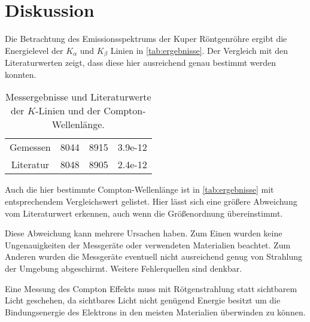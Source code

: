 \section{Diskussion}
\label{sec:Diskussion}


Die Betrachtung des Emissionsspektrums der Kuper Röntgenröhre ergibt die Energielevel der $K_\alpha$ und $K_\beta$ Linien in \autoref{tab:ergebnisse}. Der Vergleich mit den Literaturwerten zeigt, dass diese hier ausreichend genau bestimmt werden konnten.

\begin{table}
    \centering
    \caption{Messergebnisse und Literaturwerte der $K$-Linien und der Compton-Wellenlänge.}
    \begin{tabular}{c S[table-format=4.0] S[table-format=4.0] S[table-format=1.3e-2]}
        \toprule
        &  &  & \\
        \midrule
        Gemessen & 8044 & 8915 & 3.9e-12 \\
        Literatur\cite{xray}\cite{physics_constants} & 8048 & 8905 & 2.4e-12 \\
        \bottomrule
    \end{tabular}
    \label{tab:ergebnisse}
\end{table}

Auch die hier bestimmte Compton-Wellenlänge ist in \autoref{tab:ergebnisse} mit entsprechendem Vergleichswert gelistet.
Hier lässt sich eine größere Abweichung vom Literaturwert erkennen, auch wenn die Größenordnung übereinstimmt.

Diese Abweichung kann mehrere Ursachen haben.
Zum Einen wurden keine Ungenauigkeiten der Messgeräte oder verwendeten Materialien beachtet.
Zum Anderen wurden die Messgeräte eventuell nicht ausreichend genug von Strahlung der Umgebung abgeschirmt.
Weitere Fehlerquellen sind denkbar.

Eine Messung des Compton Effekts muss mit Rötgenstrahlung statt sichtbarem Licht geschehen, da sichtbares Licht nicht genügend Energie besitzt um die Bindungsenergie des Elektrons in den meisten Materialien überwinden zu können.